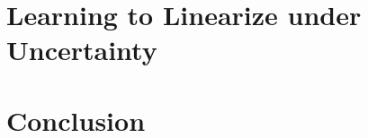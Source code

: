 \documentclass[12pt,letterpaper]{report}
\newcommand{\appendixchapter}[1]{%
    \refstepcounter{appendixchapter}%
    \refstepcounter{chapter}%
    \renewcommand{\DOTIS}[1]{\DOCH \DOTI{#1}}
    \chapter*{#1}
    \addcontentsline{apx}{appendixchapter}{Appendix \protect\numberline{\theappendixchapter}#1}\par%
    \vspace {-1.47cm}}
\renewcommand{\theappendixchapter}{\Alph{appendixchapter}}
\begin{document}
\chapter{Learning to Linearize under Uncertainty}
\label{chapter:linear} 

\chapter{Conclusion} 
\label{chapter:conclusion} 

\FloatBarrier
\clearpage



\FloatBarrier
\newpage

\singlespacing
\printbibliography
\end{document}
